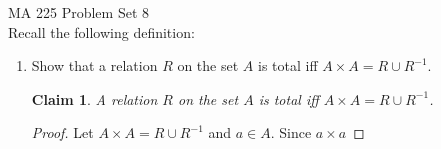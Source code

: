 \documentclass[11pt]{letter}
\newtheorem{claim}{Claim}
\theoremstyle{definition}
\begin{document}
\pagestyle{empty}

{\Large MA 225 Problem Set 8}\\

Recall the following definition:


	\begin{enumerate}
	\item Show that a relation $R$ on the set $A$ is total iff $A\times A=R\cup R^{-1}$.
          \begin{claim}
            A relation $R$ on the set $A$ is total iff $A\times A=R\cup R^{-1}$.
          \end{claim}
          \begin{proof}
            Let $A\times A=R\cup R^{-1}$ and $a\in A$. Since $a\times a$
          \end{proof}
          

\end{enumerate}
\end{document}
